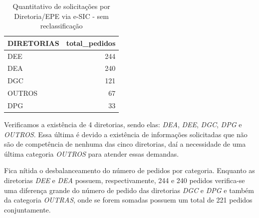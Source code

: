 \documentclass[]{article}
\newenvironment{Shaded}{\begin{snugshade}}{\end{snugshade}}
\newcommand{\DataTypeTok}[1]{\textcolor[rgb]{0.13,0.29,0.53}{#1}}
\newcommand{\KeywordTok}[1]{\textcolor[rgb]{0.13,0.29,0.53}{\textbf{#1}}}
\newcommand{\NormalTok}[1]{#1}
\newcommand{\OperatorTok}[1]{\textcolor[rgb]{0.81,0.36,0.00}{\textbf{#1}}}
\newcommand{\OtherTok}[1]{\textcolor[rgb]{0.56,0.35,0.01}{#1}}
\newcommand{\StringTok}[1]{\textcolor[rgb]{0.31,0.60,0.02}{#1}}
\begin{document}
\begin{Shaded}
\end{Shaded}

\begin{table}[!h]

\caption{\label{tab:unnamed-chunk-22}Quantitativo de solicitações por Diretoria/EPE via e-SIC - sem reclassificação}
\centering
\begin{tabular}{lr}
\toprule
DIRETORIAS & total\_pedidos\\
\midrule
\rowcolor{gray!6}  DEE & 244\\
DEA & 240\\
\rowcolor{gray!6}  DGC & 121\\
OUTROS & 67\\
\rowcolor{gray!6}  DPG & 33\\
\bottomrule
\end{tabular}
\end{table}

Verificamos a existência de 4 diretorias, sendo elas: \emph{DEA},
\emph{DEE}, \emph{DGC}, \emph{DPG} e \emph{OUTROS}. Essa última é devido
a existência de informações solicitadas que não são de competência de
nenhuma das cinco diretorias, daí a necessidade de uma última categoria
\emph{OUTROS} para atender essas demandas.

Fica nítida o desbalanceamento do número de pedidos por categoria.
Enquanto as diretorias \emph{DEE} e \emph{DEA} possuem, respectivamente,
244 e 240 pedidos verifica-se uma diferença grande do número de pedido
das diretorias \emph{DGC} e \emph{DPG} e também da categoria
\emph{OUTRAS}, onde se forem somadas possuem um total de 221 pedidos
conjuntamente.
\end{document}
